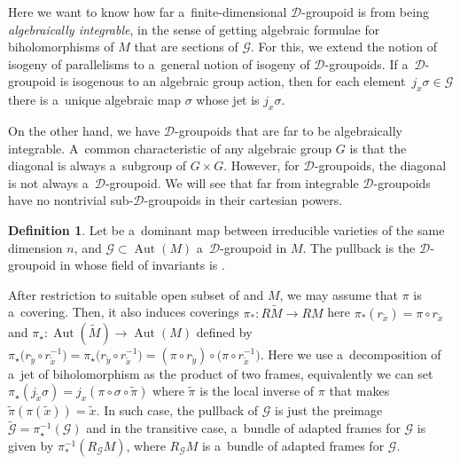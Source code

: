 \documentclass[pdftex]{sigma}
\numberwithin{equation}{section}
\theoremstyle{definition}
\newtheorem{Definition}[Theorem]{Definition}
\begin{document}
Here we want to know how far a~finite-dimensional $\mathcal D$-groupoid is from being \emph{algebraically integrable}, in the sense of getting algebraic formulae for biholomorphisms of $M$ that are sections of $\mathcal G$. For this, we extend the notion of isogeny of parallelisms to a~general notion of isogeny of $\mathcal D$-groupoids. If a~$\mathcal D$-groupoid is isogenous to an algebraic group action, then for each element~${j_x\sigma\in \mathcal G}$ there is a~unique algebraic map $\sigma$ whose jet is $j_x\sigma$.

On the other hand, we have $\mathcal D$-groupoids that are far to be algebraically integrable. A~common characteristic of any algebraic group $G$ is that the diagonal is always a~subgroup of $G\times G$. However, for $\mathcal D$-groupoids, the diagonal is not always a~$\mathcal D$-groupoid. We will see that far from integrable $\mathcal D$-groupoids have no nontrivial sub-$\mathcal D$-groupoids in their cartesian powers.

\begin{Definition}
Let  be a~dominant map between irreducible
varieties of the same dimension $n$, and $\mathcal G\subset \operatorname{Aut}(M)$ a~$\mathcal D$-groupoid in $M$.
The pullback 
is the $\mathcal D$-groupoid in  whose field of invariants is .
\end{Definition}

After restriction to suitable open subset of  and $M$, we may assume that $\pi$ is a~covering. Then, it also induces coverings $\pi_*\colon R\widetilde M \to RM$ here $\pi_*(r_{\widetilde x})= \pi \circ r_{\widetilde x}$ and $\pi_\star\colon \operatorname{Aut}(\widetilde M) \to \operatorname{Aut}(M)$ defined by
$\pi_{\star}\bigl(r_{\widetilde y} \circ r_{\widetilde x}^{-1}\bigr) =
\pi_{\star}\bigl(r_{\widetilde y} \circ r_{\widetilde x}^{-1}\bigr) = (\pi\circ r_{\widetilde y}) \circ \bigl(\pi \circ r_{\widetilde x}^{-1}\bigr)$. Here we use a~decomposition of a~jet of biholomorphism as the product of two frames, equivalently we can set $\pi_\star(j_{\widetilde x}\sigma) = j_x (\pi\circ \sigma \circ \widetilde\pi)$
where $\widetilde\pi$ is the local inverse of $\pi$ that makes $\widetilde\pi(\pi(\widetilde x)) = \widetilde x$. In such case, the pullback of $\mathcal G$ is just the preimage $\widetilde{\mathcal G} = \pi_\star^{-1}(\mathcal G)$ and in the transitive case, a~bundle of adapted frames for $\mathcal G$ is given by $\pi_{*}^{-1}(R_{\mathcal G} M)$, where $R_{\mathcal G} M$ is a~bundle of adapted frames for $\mathcal G$.
\end{document}
